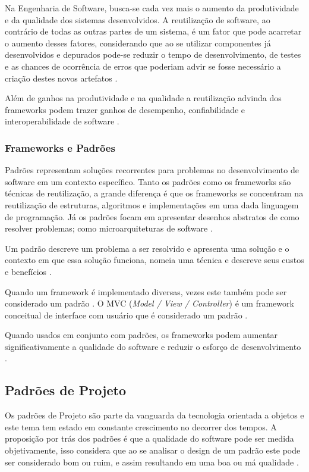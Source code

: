 Na Engenharia de Software, busca-se cada vez mais o aumento da produtividade e da qualidade dos sistemas desenvolvidos. A reutilização de software, ao contrário de todas as outras partes de um sistema, é um fator que pode acarretar o aumento desses fatores, considerando que ao se utilizar componentes já desenvolvidos e depurados pode-se reduzir o tempo de desenvolvimento, de testes e as chances de ocorrência de erros que poderiam advir se fosse necessário a criação destes novos artefatos \cite{Silva:2000}.

Além de ganhos na produtividade e na qualidade a reutilização advinda dos frameworks podem trazer ganhos de desempenho, confiabilidade e interoperabilidade de software \cite{Fayad:Schimidt:1997}.

\subsubsection{Frameworks e Padrões}

Padrões representam soluções recorrentes para problemas no desenvolvimento de software em um contexto específico. Tanto os padrões como os frameworks são técnicas de reutilização, a grande diferença é que os frameworks 	se concentram na reutilização de estruturas, algoritmos e implementações em uma dada linguagem de programação. Já os padrões focam em apresentar desenhos abstratos de como resolver problemas; como microarquiteturas de software \cite{Fayad:Schimidt:1997}.

Um padrão descreve um problema a ser resolvido e apresenta uma solução e o contexto em que essa solução funciona, nomeia uma técnica e descreve seus custos e benefícios \cite{Johnson:1997}.

Quando um framework é implementado diversas, vezes este também pode ser considerado um padrão \cite{Johnson:1997}. O MVC (\textit{Model / View / Controller}) é um framework conceitual de interface com usuário que é considerado um padrão \cite{Almeida:2006}.

Quando usados em conjunto com padrões, os frameworks podem aumentar significativamente a qualidade do software e reduzir o esforço de desenvolvimento \cite{Fayad:Schimidt:1997}.

\subsection{Padrões de Projeto}

Os padrões de Projeto são parte da vanguarda da tecnologia orientada a objetos e este tema tem estado em constante crescimento no decorrer dos tempos. A proposição por trás dos padrões é que a qualidade do software pode ser medida objetivamente, isso considera que ao se analisar o design de um padrão este pode ser considerado bom ou ruim, e assim resultando em uma boa ou má qualidade \cite{Shalloway:Trott:2004}.

